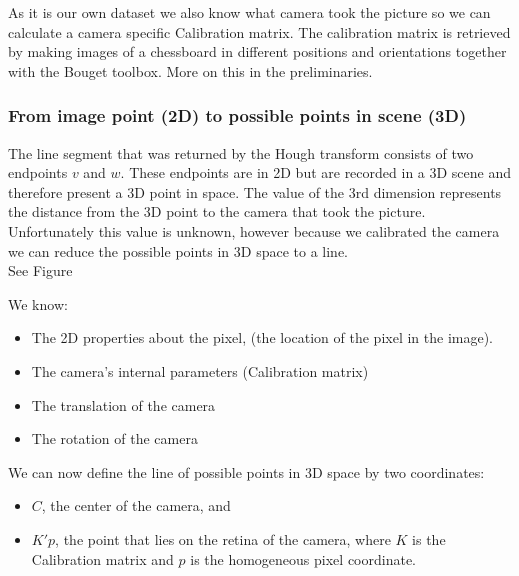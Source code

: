 
	As it is our own dataset we also know what camera took the picture so we can
	calculate a camera specific Calibration matrix.  
	The calibration matrix is retrieved by making images of a chessboard in
	different positions and orientations together with the Bouget toolbox.
	More on this in the preliminaries.
	 
	\subsubsection{From image point (2D) to possible points in scene (3D)} 
	The line segment that was returned by the Hough transform consists of two
	endpoints $v$ and $w$. These endpoints are in 2D but are recorded in a 3D
	scene and therefore present a 3D point in space.  The value of the 3rd
	dimension represents the distance from the 3D point to the camera that took
	the picture. Unfortunately this value is unknown, however because we
	calibrated the camera we can reduce the possible points in 3D space to a
	line.\\
	See Figure %

	We know:
	\begin{itemize}
		\item The 2D properties about the pixel, (the location of the pixel in the image). 
		\item The camera's internal parameters (Calibration matrix) \\
		\item The translation of the camera
		\item The rotation of the camera
	\end{itemize}

	We can now define the line of possible points in 3D space by two coordinates:\\
	\begin{itemize}
		\item $C$, the center of the camera, and
		\item $K'p$, the point that lies on the retina of the camera, where $K$ is the Calibration matrix and $p$ is the homogeneous pixel coordinate.
	\end{itemize}

